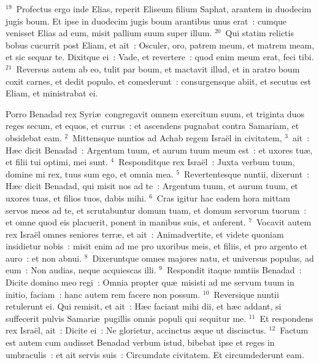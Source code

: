 ${}^{19}$~Profectus ergo inde Elias, reperit Eliseum filium Saphat, arantem in duodecim jugis boum. Et ipse in duodecim jugis boum arantibus unus erat~: cumque venisset Elias ad eum, misit pallium suum super illum.
${}^{20}$~Qui statim relictis bobus cucurrit post Eliam, et ait~: Osculer, oro, patrem meum, et matrem meam, et sic sequar te. Dixitque ei~: Vade, et revertere~: quod enim meum erat, feci tibi.
${}^{21}$~Reversus autem ab eo, tulit par boum, et mactavit illud, et in aratro boum coxit carnes, et dedit populo, et comederunt~: consurgensque abiit, et secutus est Eliam, et ministrabat ei.

\bchapter
\lettrine[lines=3,image=true,loversize=0.05,lraise=-0.03]{P}{}orro Benadad rex Syri\ae\ congregavit omnem exercitum suum, et triginta duos reges secum, et equos, et currus~: et ascendens pugnabat contra Samariam, et obsidebat eam.
${}^{2}$~Mittensque nuntios ad Achab regem Isra\"el in civitatem,
${}^{3}$~ait~: H\ae c dicit Benadad~: Argentum tuum, et aurum tuum meum est~: et uxores tu\ae , et filii tui optimi, mei sunt.
${}^{4}$~Responditque rex Isra\"el~: Juxta verbum tuum, domine mi rex, tuus sum ego, et omnia mea.
${}^{5}$~Revertentesque nuntii, dixerunt~: H\ae c dicit Benadad, qui misit nos ad te~: Argentum tuum, et aurum tuum, et uxores tuas, et filios tuos, dabis mihi.
${}^{6}$~Cras igitur hac eadem hora mittam servos meos ad te, et scrutabuntur domum tuam, et domum servorum tuorum~: et omne quod eis placuerit, ponent in manibus suis, et auferent.
${}^{7}$~Vocavit autem rex Isra\"el omnes seniores terr\ae , et ait~: Animadvertite, et videte quoniam insidietur nobis~: misit enim ad me pro uxoribus meis, et filiis, et pro argento et auro~: et non abnui.
${}^{8}$~Dixeruntque omnes majores natu, et universus populus, ad eum~: Non audias, neque acquiescas illi.
${}^{9}$~Respondit itaque nuntiis Benadad~: Dicite domino meo regi~: Omnia propter qu\ae\ misisti ad me servum tuum in initio, faciam~: hanc autem rem facere non possum.
${}^{10}$~Reversique nuntii retulerunt ei. Qui remisit, et ait~: H\ae c faciant mihi dii, et h\ae c addant, si suffecerit pulvis Samari\ae\ pugillis omnis populi qui sequitur me.
${}^{11}$~Et respondens rex Isra\"el, ait~: Dicite ei~: Ne glorietur, accinctus \ae que ut discinctus.
${}^{12}$~Factum est autem cum audisset Benadad verbum istud, bibebat ipse et reges in umbraculis~: et ait servis suis~: Circumdate civitatem. Et circumdederunt eam.


